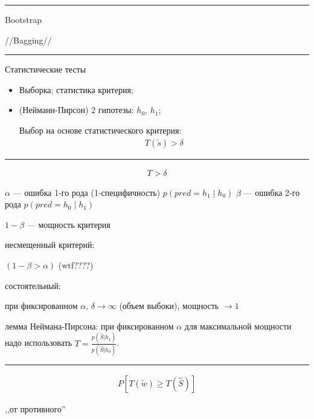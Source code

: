 \documentclass{book}
\begin{document}
\hrule
Bootstrap

//Bagging//

\hrule

Статистические тесты

\begin{itemize}
    \item Выборка; статистика критерия;
    \item (Нейманн-Пирсон) 2 гипотезы: $h_0$, $h_1$;

        Выбор на основе статистического критерия:
        \begin{gather*}
          T(\tilde{s}) > \delta
        \end{gather*}
\end{itemize}

\hrule

\begin{gather*}
  T>\delta
\end{gather*}


$\alpha$ --- ошибка 1-го рода  (1-специфичность) $p(pred=h_1\mid h_0)$
$\beta$ --- ошибка 2-го рода $p(pred=h_0\mid h_1)$

$1-\beta$ --- мощность критерия

несмещенный критерий:

$(1-\beta > \alpha)$ (wtf????)

состоятельный:

при фиксированном $\alpha$,  $\delta \rightarrow \infty$ (объем выбоки), мощность $\rightarrow 1$

лемма Неймана-Пирсона: при фиксированном $\alpha$ для максимальной мощности надо использовать $T=\frac{p(\hat{S}|h_1)}{p(\hat{S}|h_0)}$.

\hrule

\begin{gather*}
  P[T(\tilde{w})\geq T(\hat{S})]
\end{gather*}

,,от противного''
\end{document}
